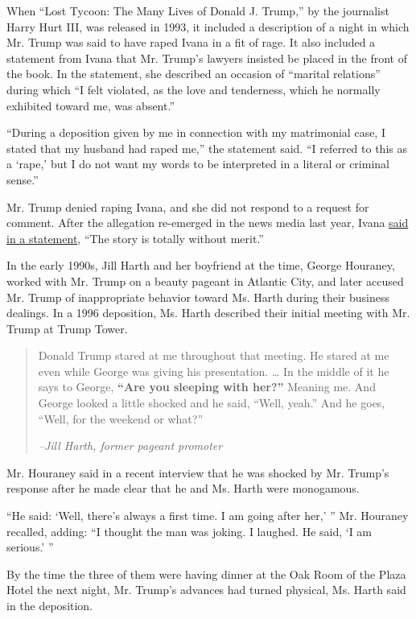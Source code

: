 When ``Lost Tycoon: The Many Lives of Donald J. Trump,'' by the
journalist Harry Hurt III, was released in 1993, it included a
description of a night in which Mr. Trump was said to have raped Ivana
in a fit of rage. It also included a statement from Ivana that Mr.
Trump's lawyers insisted be placed in the front of the book. In the
statement, she described an occasion of ``marital relations'' during
which ``I felt violated, as the love and tenderness, which he normally
exhibited toward me, was absent.''

``During a deposition given by me in connection with my matrimonial
case, I stated that my husband had raped me,'' the statement said. ``I
referred to this as a `rape,' but I do not want my words to be
interpreted in a literal or criminal sense.''

Mr. Trump denied raping Ivana, and she did not respond to a request for
comment. After the allegation re-emerged in the news media last year,
Ivana
\href{http://www.nytimes3xbfgragh.onion/politics/first-draft/2015/07/28/donald-trump-aide-apologizes-for-saying-you-cant-rape-your-spouse/}{said
in a statement}, ``The story is totally without merit.''

In the early 1990s, Jill Harth and her boyfriend at the time, George
Houraney, worked with Mr. Trump on a beauty pageant in Atlantic City,
and later accused Mr. Trump of inappropriate behavior toward Ms. Harth
during their business dealings. In a 1996 deposition, Ms. Harth
described their initial meeting with Mr. Trump at Trump Tower.

\begin{quote}
Donald Trump stared at me throughout that meeting. He stared at me even
while George was giving his presentation. \ldots{} In the middle of it
he says to George, \textbf{``Are you sleeping with her?''} Meaning me.
And George looked a little shocked and he said, ``Well, yeah.'' And he
goes, ``Well, for the weekend or what?''

\emph{--Jill Harth, former pageant promoter}
\end{quote}

Mr. Houraney said in a recent interview that he was shocked by Mr.
Trump's response after he made clear that he and Ms. Harth were
monogamous.

``He said: `Well, there's always a first time. I am going after her,' ''
Mr. Houraney recalled, adding: ``I thought the man was joking. I
laughed. He said, `I am serious.' ''

By the time the three of them were having dinner at the Oak Room of the
Plaza Hotel the next night, Mr. Trump's advances had turned physical,
Ms. Harth said in the deposition.

